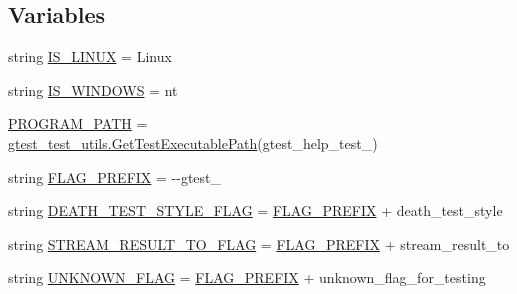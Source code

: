 \subsection*{Variables}
\begin{DoxyCompactItemize}
\item 
string \mbox{\hyperlink{namespacegoogletest_1_1test_1_1gtest__help__test_aa19ea7c5533b22651c1fe106f0555c0f}{I\+S\+\_\+\+L\+I\+N\+UX}} = \textquotesingle{}Linux\textquotesingle{}
\item 
string \mbox{\hyperlink{namespacegoogletest_1_1test_1_1gtest__help__test_a7195876d87720d6cf445f1ccfe2bc4d3}{I\+S\+\_\+\+W\+I\+N\+D\+O\+WS}} = \textquotesingle{}nt\textquotesingle{}
\item 
\mbox{\hyperlink{namespacegoogletest_1_1test_1_1gtest__help__test_a5bd5d40da9019419f2321edfcc1ebca5}{P\+R\+O\+G\+R\+A\+M\+\_\+\+P\+A\+TH}} = \mbox{\hyperlink{namespacegoogletest_1_1test_1_1gtest__test__utils_ac9af888c702350aac56b154a6af34098}{gtest\+\_\+test\+\_\+utils.\+Get\+Test\+Executable\+Path}}(\textquotesingle{}gtest\+\_\+help\+\_\+test\+\_\+\textquotesingle{})
\item 
string \mbox{\hyperlink{namespacegoogletest_1_1test_1_1gtest__help__test_abcdf68c576877303d231c0f463920b0b}{F\+L\+A\+G\+\_\+\+P\+R\+E\+F\+IX}} = \textquotesingle{}-\/-\/gtest\+\_\+\textquotesingle{}
\item 
string \mbox{\hyperlink{namespacegoogletest_1_1test_1_1gtest__help__test_ab4c417510ddf5d0080df15544c4fd366}{D\+E\+A\+T\+H\+\_\+\+T\+E\+S\+T\+\_\+\+S\+T\+Y\+L\+E\+\_\+\+F\+L\+AG}} = \mbox{\hyperlink{namespacegoogletest_1_1test_1_1gtest__help__test_abcdf68c576877303d231c0f463920b0b}{F\+L\+A\+G\+\_\+\+P\+R\+E\+F\+IX}} + \textquotesingle{}death\+\_\+test\+\_\+style\textquotesingle{}
\item 
string \mbox{\hyperlink{namespacegoogletest_1_1test_1_1gtest__help__test_ae7192f9cfd231c746962fcb20b2c03be}{S\+T\+R\+E\+A\+M\+\_\+\+R\+E\+S\+U\+L\+T\+\_\+\+T\+O\+\_\+\+F\+L\+AG}} = \mbox{\hyperlink{namespacegoogletest_1_1test_1_1gtest__help__test_abcdf68c576877303d231c0f463920b0b}{F\+L\+A\+G\+\_\+\+P\+R\+E\+F\+IX}} + \textquotesingle{}stream\+\_\+result\+\_\+to\textquotesingle{}
\item 
string \mbox{\hyperlink{namespacegoogletest_1_1test_1_1gtest__help__test_a54f37b46da97d7fcfb443a8c5d2a6c43}{U\+N\+K\+N\+O\+W\+N\+\_\+\+F\+L\+AG}} = \mbox{\hyperlink{namespacegoogletest_1_1test_1_1gtest__help__test_abcdf68c576877303d231c0f463920b0b}{F\+L\+A\+G\+\_\+\+P\+R\+E\+F\+IX}} + \textquotesingle{}unknown\+\_\+flag\+\_\+for\+\_\+testing\textquotesingle{}

\end{DoxyCompactItemize}
